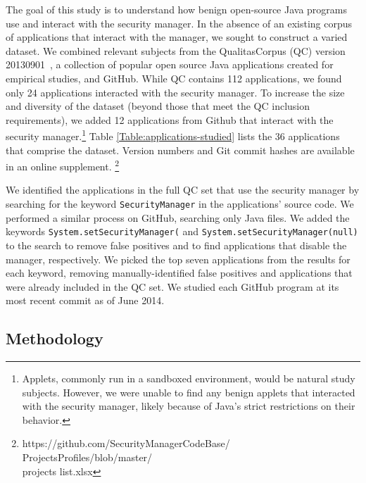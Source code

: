 \documentclass{sig-alternate}
\begin{document}
The goal of this study is to understand how benign open-source Java programs use
and interact with the security manager.  In the absence of an existing corpus of
applications that interact with the manager, we sought to construct a varied dataset.
We combined relevant subjects from 
the QualitasCorpus (QC) version 20130901~\cite{QualitasCorpus:APSEC:2010}, a 
collection of popular open source Java applications created for empirical
studies, and GitHub.
While QC contains 112 applications, we found only 24 applications interacted with 
the security manager.  To increase the size and diversity of the dataset (beyond
those that meet the QC inclusion requirements), we
added 12 applications from Github that interact with the security manager.\footnote{Applets, commonly
run in a sandboxed environment, would be natural study subjects.  However, we were unable
to find any benign applets that interacted with the security manager, likely
because of Java's strict restrictions on their behavior.}
 Table
\ref{Table:applications-studied} lists the 36 applications that comprise the
dataset.  Version numbers
and Git commit hashes are available in an online supplement.%
\footnote{https://github.com/SecurityManagerCodeBase/\\
ProjectsProfiles/blob/master/\\
projects list.xlsx}

We identified the applications in the full QC set that use the security
manager by searching for the keyword \texttt{SecurityManager} in the applications'
source code.  We performed a similar process on
GitHub, searching only Java files. We added the keywords
\texttt{System.setSecurityManager(} and \texttt{System.setSecurityManager(null)}
to the search to remove false positives and to find applications that disable the
manager, respectively. We picked the top seven applications from the results for each keyword,
removing manually-identified false positives and applications that were
already included in the QC set. We studied each GitHub program at its most
recent commit as of June 2014.

\subsection{Methodology}
\label{sec:methodology}
\end{document}
